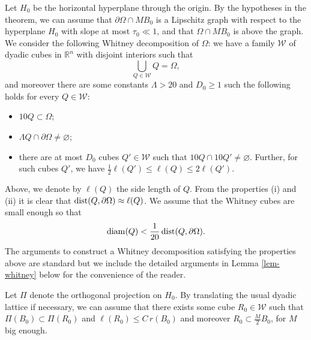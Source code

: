 \documentclass[11pt]{amsart}
\newcommand{\R}{{\mathbb R}}       %
\newcommand{\DD}{{\mathcal D}}
\newcommand{\WW}{{\mathcal W}}
\newcommand{\diam}{{\rm diam}}
\newcommand{\dist}{{\rm dist}}
\newcommand{\rf}[1]{{(\ref{#1})}}
\theoremstyle{definition}
\theoremstyle{remark}
\numberwithin{equation}{section}
\begin{document}
Let $H_0$ be the horizontal hyperplane through the origin.
By the hypotheses in the theorem, we can assume that $\partial \Omega\cap MB_0$ is a Lipschitz graph with respect to the hyperplane $H_0$ with slope at most $\tau_0\ll1$, and that $\Omega\cap MB_0$
is above the graph.
We 
consider the following Whitney decomposition of $\Omega$: we have a family $\WW$ of dyadic cubes in $\R^n$ with disjoint interiors such that
$$\bigcup_{Q\in\WW} Q = \Omega,$$
and moreover there are
 some constants $\Lambda>20$ and $D_0\geq1$ such the following holds for every $Q\in\WW$:
\begin{itemize}
\item[(i)] $10Q \subset \Omega$;
\item[(ii)] $\Lambda Q \cap \partial\Omega \neq \varnothing$;
\item[(iii)] there are at most $D_0$ cubes $Q'\in\WW$
such that $10Q \cap 10Q' \neq \varnothing$. Further, for such cubes $Q'$, we have $\frac12\ell(Q')\leq \ell(Q)\leq 2\ell(Q')$.
\end{itemize}
Above, we denote by $\ell(Q)$ the side length of $Q$. 
From the properties (i) and (ii) it is clear that $\dist(Q,\partial\Omega)\approx\ell(Q)$. We assume that
the Whitney cubes are small enough so that
\begin{equation}\label{eqeq29}
\diam(Q)< \frac1{20}\,\dist(Q,\partial\Omega).
\end{equation}
The arguments to construct a Whitney decomposition satisfying the properties above are
standard but we include the detailed arguments in Lemma 
\ref{lem-whitney} below for the convenience of the reader.


Let $\Pi$ denote the
orthogonal projection on $H_0$.
By translating the usual dyadic
lattice if necessary, we can
assume that there exists some cube $R_0\in\WW$ such that $\Pi(B_0)\subset \Pi(R_0)$ and  $\ell(R_0)\leq C\,r(B_0)$ and moreover $R_0 \subset \frac M2B_0$, for $M$ big enough.
\end{document}
